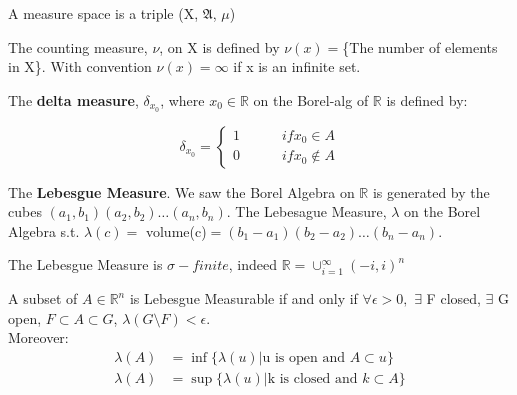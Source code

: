 \begin{leftbar}
\begin{define}
	A measure space is a triple (X, $\mathfrak{A}$, $\mu$) 
\end{define}
\end{leftbar}

\begin{ex}
	The counting measure, $\nu$, on X is defined by $\nu(x)=$\{The number of elements in X\}. With convention $\nu(x)=\infty$ if x is an infinite set.
\end{ex}

\begin{ex}
	The \textbf{delta measure}, $\delta_{x_{0}}$, where $x_{0}\in\mathbb{R}$ on the Borel-alg of $\mathbb{R}$ is defined by:
	
	\[
	\delta_{x_{0}} = \begin{cases}
					  1 \hspace{3em}if x_{0}\in A\\
					  0 \hspace{3em}if x_{0}\notin A
	\end{cases}
	\]
\end{ex}

\begin{ex}
	The \textbf{Lebesgue Measure}. We saw the Borel Algebra on $\mathbb{R}$ is generated by the cubes $(a_{1},b_{1})(a_{2},b_{2})\dots(a_{n},b_{n})$. The Lebesague Measure, $\lambda$ on the Borel Algebra s.t. $\lambda(c)=$ volume(c)$=(b_{1}-a_{1})(b_{2}-a_{2})\dots(b_{n}-a_{n})$.
\end{ex}

 The Lebesgue Measure is $\sigma-finite$, indeed $\mathbb{R}=\cup_{i=1}^{\infty}(-i,i)^{n}$

\begin{leftbar}
\begin{thm}
	A subset of $A\in\mathbb{R}^{n}$ is Lebesgue Measurable if and only if $\forall \epsilon > 0,$ $\exists$ F closed, $\exists$ G open, $F\subset A \subset G$, $\lambda(G\setminus F)<\epsilon$.\\
	
	Moreover: 
	\[
	\begin{aligned}
	\lambda(A) &= \inf \{\lambda(u) | \text{u is open and } A\subset u \}\\
	\lambda(A) &= \sup \{\lambda(u) | \text{k is closed and } k\subset A \}
	\end{aligned}
	\]
\end{thm}
\end{leftbar}

